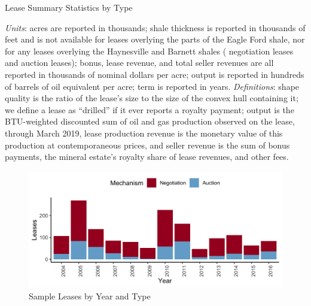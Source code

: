 \addtolength{\tabcolsep}{-3pt}
\begin{table}[htpb]
\begin{center}
\begin{threeparttable}
	\caption{Lease Summary Statistics by Type}
	\label{tab:summary_stats}
 	\small
	
	\footnotesize
    \begin{tablenotes}
    \item \textit{Units}: acres are reported in thousands; shale thickness is reported in thousands of feet and is not available for leases overlying the parts of the Eagle Ford shale, nor for any leases overlying the Haynesville and Barnett shales ( negotiation leases and  auction leases); bonus, lease revenue, and total seller revenues are all reported in thousands of nominal dollars per acre; output is reported in hundreds of barrels of oil equivalent per acre; term is reported in years.  \textit{Definitions}: shape quality is the ratio of the lease's size to the size of the convex hull containing it; we define a lease as ``drilled'' if it ever reports a royalty payment; output is the BTU-weighted discounted sum of oil and gas production observed on the lease, through March 2019, lease production revenue is the monetary value of this production at contemporaneous prices, and seller revenue is the sum of bonus payments, the mineral estate's royalty share of lease revenues, and other fees. 
    \end{tablenotes}
\end{threeparttable}
\end{center}
\end{table}

\addtolength{\tabcolsep}{3pt}

\begin{figure}
    \centering
    \caption{Sample Leases by Year and Type}
	\label{fig:cohorts}
	\includegraphics[width=1\textwidth]{../output/figures/cohorts.png}
\end{figure}

